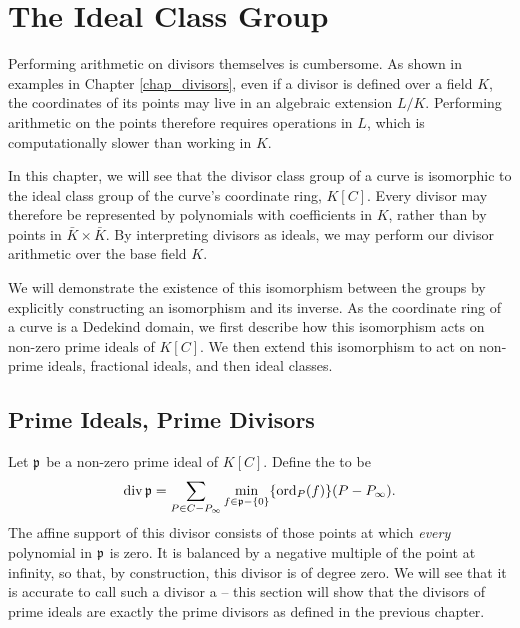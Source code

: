 
\section{The Ideal Class Group}
\label{chap_ideals}

Performing arithmetic on divisors themselves is cumbersome.
As shown in examples in Chapter \ref{chap_divisors},
even if a divisor is defined over a field $K$,
the coordinates of its points may live in an algebraic extension $L/K$.
Performing arithmetic on the points therefore requires operations in $L$,
which is computationally slower than working in $K$.

In this chapter, we will see that the divisor class group of a curve
is isomorphic to the ideal class group of the curve's coordinate ring, $K[C]$.
Every divisor may therefore be represented by polynomials with coefficients in $K$,
rather than by points in $\bar K \times \bar K$.
By interpreting divisors as ideals,
we may perform our divisor arithmetic over the base field $K$.

We will demonstrate the existence of this isomorphism between the groups
by explicitly constructing an isomorphism and its inverse.
As the coordinate ring of a curve is a Dedekind domain,
we first describe how this isomorphism acts on non-zero prime ideals of $K[C]$.
We then extend this isomorphism to act on non-prime ideals, fractional ideals, and then ideal classes.



\subsection{Prime Ideals, Prime Divisors}

Let $\frak p$ be a non-zero prime ideal of $K[C]$.
Define the  to be
  \[ \operatorname{div} \frak p = \sum_{P \in C - P_\infty} \min_{f \in \frak p - \{0\}}\{\operatorname{ord}_P(f)\}(P - P_\infty). \]
The affine support of this divisor consists of those points at which \emph{every} polynomial in $\frak p$ is zero.
It is balanced by a negative multiple of the point at infinity,
so that, by construction, this divisor is of degree zero.
We will see that it is accurate to call such a divisor a  --
this section will show that the divisors of prime ideals are exactly the prime divisors as defined in the previous chapter.


